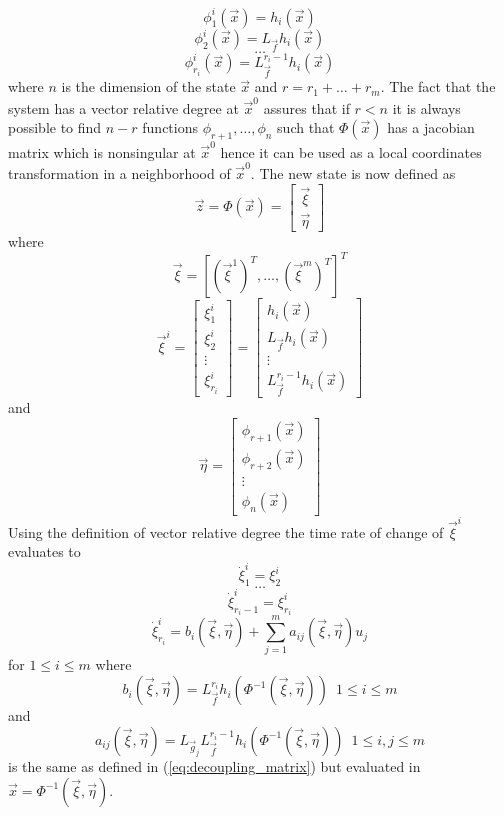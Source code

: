 \[
\phi_{1}^{i}(\vec{x}) = h_{i}(\vec{x})
\]
\[
\phi_{2}^{i}(\vec{x}) = L_{\vec{f}}h_{i}(\vec{x})
\]
\[
\hdots
\]
\[
\phi_{r_{i}}^{i}(\vec{x}) = L_{\vec{f}}^{r_{i}-1}h_i(\vec{x})
\]
where $n$ is the dimension of the state $\vec{x}$ and $r = r_1 + \hdots + r_m$.
The fact that the system has a vector relative degree at $\vec{x}^{0}$ assures that
if $r < n$ it is always possible to find $n - r$ functions $\phi_{r+1},\hdots,\phi_{n}$
such that $\Phi(\vec{x})$ has a jacobian matrix which is nonsingular at $\vec{x}^{0}$
hence it can be used as a local coordinates transformation in a neighborhood of
$\vec{x}^{0}$. The new state is now defined as
\[
\vec{z} = \Phi(\vec{x}) =
\begin{bmatrix}
  \vec{\xi}\\
  \vec{\eta}
\end{bmatrix}
\]
where
\[
\vec{\xi} = [\left(\vec{\xi}^{1}\right)^T,\hdots, \left(\vec{\xi}^{m}\right)^T]^T
\]
\[
\vec{\xi}^{i} =
\begin{bmatrix}
  \xi_{1}^{i}\\
  \xi_{2}^{i}\\
  \vdots\\
  \xi_{r_{i}}^{i}
\end{bmatrix}=
\begin{bmatrix}
  h_{i}(\vec{x})\\
  L_{\vec{f}}h_i(\vec{x})\\
  \vdots\\
  L_{\vec{f}}^{r_{i}-1}h_i(\vec{x})
\end{bmatrix}
\]
and
\[
\vec{\eta} =
\begin{bmatrix}
  \phi_{r+1}(\vec{x})\\
  \phi_{r+2}(\vec{x})\\
  \vdots\\
  \phi_{n}(\vec{x})
\end{bmatrix}
\]
Using the definition of vector relative degree the time rate of change of $\vec{\xi}^{i}$ evaluates to
\[
\dot{\xi}_{1}^{i} = \xi_{2}^{i}
\]
\[
\hdots
\]
\[
\dot{\xi}_{r_{i}-1}^{i} = \xi_{r_{i}}^{i}
\]
\[
\dot{\xi}_{r_{i}}^{i} = b_{i}(\vec{\xi},\vec{\eta}) + \sum\limits_{j=1}^{m}a_{ij}(\vec{\xi},\vec{\eta})u_{j}
\]
for $1 \le i \le m$ where
\[
b_{i}(\vec{\xi},\vec{\eta}) = L_{\vec{f}}^{r_{i}}h_{i}(\Phi^{-1}(\vec{\xi},\vec{\eta}))
\enspace 1 \le i \le m
\]
and
\[
a_{ij}(\vec{\xi},\vec{\eta}) = L_{\vec{g}_j}L_{\vec{f}}^{r_i-1}h_{i}(\Phi^{-1}(\vec{\xi},\vec{\eta}))
\enspace 1 \le i,j \le m
\]
is the same as defined in (\ref{eq:decoupling_matrix}) but evaluated in $\vec{x} = \Phi^{-1}(\vec{\xi},\vec{\eta})$.
